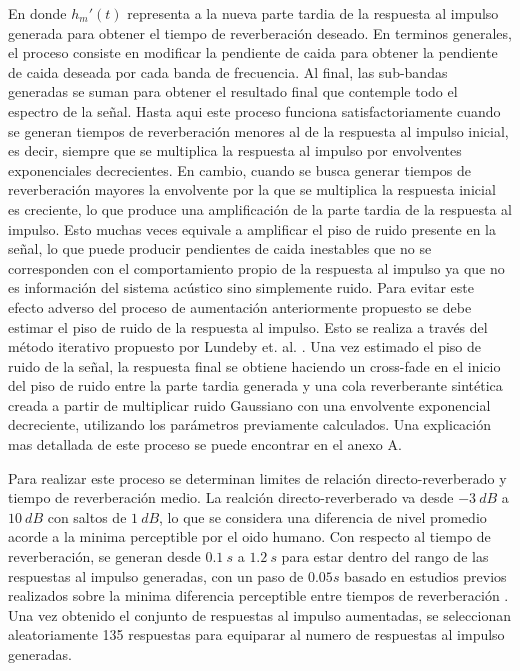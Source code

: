 En donde ${h_{m}}'(t)$ representa a la nueva parte tardia de la respuesta al impulso generada para obtener el tiempo de reverberación deseado. En terminos generales, el proceso consiste en modificar la pendiente de caida para obtener la pendiente de caida deseada por cada banda de frecuencia. Al final, las sub-bandas generadas se suman para obtener el resultado final que contemple todo el espectro de la señal. Hasta aqui este proceso funciona satisfactoriamente cuando se generan tiempos de reverberación menores al de la respuesta al impulso inicial, es decir, siempre que se multiplica la respuesta al impulso por envolventes exponenciales decrecientes. En cambio, cuando se busca generar tiempos de reverberación mayores la envolvente por la que se multiplica la respuesta inicial es creciente, lo que produce una amplificación de la parte tardia de la respuesta al impulso. Esto muchas veces equivale a amplificar el piso de ruido presente en la señal, lo que puede producir pendientes de caida inestables que no se corresponden con el comportamiento propio de la respuesta al impulso ya que no es información del sistema acústico sino simplemente ruido. Para evitar este efecto adverso del proceso de aumentación anteriormente propuesto se debe estimar el piso de ruido de la respuesta al impulso. Esto se realiza a través del método iterativo propuesto por Lundeby et. al. \cite{Lundeby}. Una vez estimado el piso de ruido de la señal, la respuesta final se obtiene haciendo un cross-fade en el inicio del piso de ruido entre la parte tardia generada y una cola reverberante sintética creada a partir de multiplicar ruido Gaussiano con una envolvente exponencial decreciente, utilizando los parámetros previamente calculados. Una explicación mas detallada de este proceso se puede encontrar en el anexo A. 

Para realizar este proceso se determinan limites de relación directo-reverberado y tiempo de reverberación medio. La realción directo-reverberado va desde $-3 \ dB$ a $10 \ dB$ con saltos de $1 \ dB$, lo que se considera una diferencia de nivel promedio acorde a la minima perceptible por el oido humano. Con respecto al tiempo de reverberación, se generan desde $0.1 \ s$ a $1.2 \ s$ para estar dentro del rango de las respuestas al impulso generadas, con un paso de $0.05 s$ basado en estudios previos realizados sobre la minima diferencia perceptible entre tiempos de reverberación \cite{aug_JND}. Una vez obtenido el conjunto de respuestas al impulso aumentadas, se seleccionan aleatoriamente 135 respuestas para equiparar al numero de respuestas al impulso generadas. 

